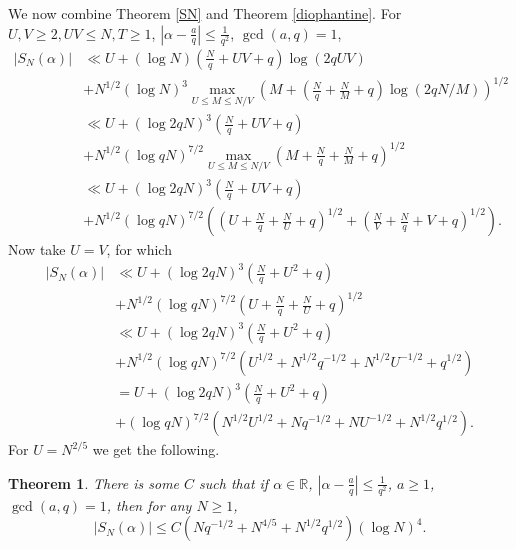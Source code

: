 \documentclass{article}
\newtheorem{theorem}{Theorem}
\theoremstyle{definition}
\begin{document}
We now combine Theorem \ref{SN} and Theorem \ref{diophantine}. For
$U,V \geq 2, UV \leq N, T \geq 1$, 
$\left| \alpha - \frac{a}{q} \right| \leq \frac{1}{q^2}$, $\gcd(a,q)=1$, 
\begin{align*}
|S_N(\alpha)|&\ll U + (\log N) \left( \frac{N}{q}+UV+q \right) \log(2qUV)\\
&+N^{1/2} (\log N)^3 \max_{U \leq M \leq N/V} \left(M+\left(\frac{N}{q}+\frac{N}{M}+q\right) \log(2q N/M) \right)^{1/2}\\
&\ll U + (\log 2qN)^3 \left(\frac{N}{q}+UV+q\right)\\
&+N^{1/2}(\log qN)^{7/2} \max_{U \leq M \leq N/V} \left(M+\frac{N}{q}+\frac{N}{M}+q\right)^{1/2}\\
&\ll U + (\log 2qN)^3 \left(\frac{N}{q}+UV+q\right)\\
&+N^{1/2}(\log qN)^{7/2} \left( \left(U+\frac{N}{q}+\frac{N}{U}+q\right)^{1/2}
+\left(\frac{N}{V} + \frac{N}{q} + V + q\right)^{1/2} \right).
\end{align*}
Now take $U=V$, for which
\begin{align*}
|S_N(\alpha)|&\ll U + (\log 2qN)^3 \left(\frac{N}{q}+U^2+q\right)\\
&+N^{1/2}(\log qN)^{7/2}  \left(U+\frac{N}{q}+\frac{N}{U}+q\right)^{1/2}\\
&\ll U + (\log 2qN)^3 \left(\frac{N}{q}+U^2+q\right)\\
&+N^{1/2}(\log qN)^{7/2}  (U^{1/2} + N^{1/2} q^{-1/2} + N^{1/2} U^{-1/2} + q^{1/2})\\
&=U+(\log 2qN)^3 \left(\frac{N}{q}+U^2+q\right)\\
&+(\log qN)^{7/2} (N^{1/2}U^{1/2}
+Nq^{-1/2} + NU^{-1/2} + N^{1/2} q^{1/2}).
\end{align*}
For $U=N^{2/5}$ we get the following.

\begin{theorem}
There is some $C$ such that if $\alpha \in \mathbb{R}$, $\left|\alpha -\frac{a}{q}\right| \leq \frac{1}{q^2}$, $a \geq 1$, $\gcd(a,q)=1$, then
for any $N \geq 1$,
\[
|S_N(\alpha)| \leq C (Nq^{-1/2} + N^{4/5} + N^{1/2} q^{1/2}) (\log N)^4.
\]
\end{theorem}
\end{document}
